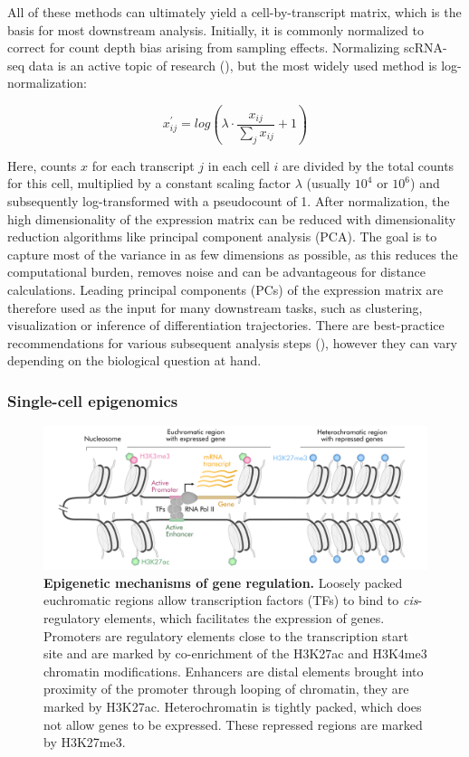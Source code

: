 All of these methods can ultimately yield a cell-by-transcript matrix, which is the basis for most downstream analysis. Initially, it is commonly normalized to correct for count depth bias arising from sampling effects. Normalizing scRNA-seq data is an active topic of research (\cite{lause_analytic_2021,hafemeister_normalization_2019,townes_feature_2019,vallejos_normalizing_2017}), but the most widely used method is log-normalization:

\[ x^{\prime}_{ij} = log(\lambda \cdot  \frac{x_{ij}}{\sum_{j}{x_{ij}}} + 1)  \]

Here, counts $x$ for each transcript $j$ in each cell $i$ are divided by the total counts for this cell, multiplied by a constant scaling factor $\lambda$ (usually $10^4$ or $10^6$) and subsequently log-transformed with a pseudocount of 1. After normalization, the high dimensionality of the expression matrix can be reduced with dimensionality reduction algorithms like principal component analysis (PCA). The goal is to capture most of the variance in as few dimensions as possible, as this reduces the computational burden, removes noise and can be advantageous for distance calculations. Leading principal components (PCs) of the expression matrix are therefore used as the input for many downstream tasks, such as clustering, visualization or inference of differentiation trajectories. There are best-practice recommendations for various subsequent analysis steps (\cite{luecken_current_2019}), however they can vary depending on the biological question at hand.


\subsubsection{Single-cell epigenomics}

\begin{figure}[t!]
  \centering
\includegraphics[width=\textwidth]{figures/introduction/Figure_3}
  \caption{\textbf{Epigenetic mechanisms of gene regulation.} Loosely packed euchromatic regions allow transcription factors (TFs) to bind to \textit{cis}-regulatory elements, which facilitates the expression of genes. Promoters are regulatory elements close to the transcription start site and are marked by co-enrichment of the H3K27ac and H3K4me3 chromatin modifications. Enhancers are distal elements brought into proximity of the promoter through looping of chromatin, they are marked by H3K27ac. Heterochromatin is tightly packed, which does not allow genes to be expressed. These repressed regions are marked by H3K27me3.}
  \label{fig:intro3}
\end{figure}

